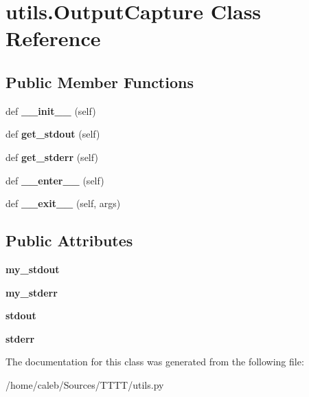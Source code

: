 \hypertarget{classutils_1_1OutputCapture}{}\section{utils.\+Output\+Capture Class Reference}
\label{classutils_1_1OutputCapture}
\subsection*{Public Member Functions}
\begin{DoxyCompactItemize}
\item 
\hypertarget{classutils_1_1OutputCapture_a12b47e1c17a8feb9449a99fcba7c73c0}{}\label{classutils_1_1OutputCapture_a12b47e1c17a8feb9449a99fcba7c73c0} 
def {\bfseries \+\_\+\+\_\+init\+\_\+\+\_\+} (self)
\item 
\hypertarget{classutils_1_1OutputCapture_a5920406b09c247bbcf35926684d5de7d}{}\label{classutils_1_1OutputCapture_a5920406b09c247bbcf35926684d5de7d} 
def {\bfseries get\+\_\+stdout} (self)
\item 
\hypertarget{classutils_1_1OutputCapture_a6f2f0f058167cdb4fb5a5e783ab9fe29}{}\label{classutils_1_1OutputCapture_a6f2f0f058167cdb4fb5a5e783ab9fe29} 
def {\bfseries get\+\_\+stderr} (self)
\item 
\hypertarget{classutils_1_1OutputCapture_a331101c4932b35b5b4d278d24d2b8bc4}{}\label{classutils_1_1OutputCapture_a331101c4932b35b5b4d278d24d2b8bc4} 
def {\bfseries \+\_\+\+\_\+enter\+\_\+\+\_\+} (self)
\item 
\hypertarget{classutils_1_1OutputCapture_ac8d3b8385124dce14a15cae263d1ef4c}{}\label{classutils_1_1OutputCapture_ac8d3b8385124dce14a15cae263d1ef4c} 
def {\bfseries \+\_\+\+\_\+exit\+\_\+\+\_\+} (self, args)
\end{DoxyCompactItemize}
\subsection*{Public Attributes}
\begin{DoxyCompactItemize}
\item 
\hypertarget{classutils_1_1OutputCapture_aea50ad5e82819a82336ebfbf059a5817}{}\label{classutils_1_1OutputCapture_aea50ad5e82819a82336ebfbf059a5817} 
{\bfseries my\+\_\+stdout}
\item 
\hypertarget{classutils_1_1OutputCapture_a37a95896d078d8272b8a6d3fe5d8c726}{}\label{classutils_1_1OutputCapture_a37a95896d078d8272b8a6d3fe5d8c726} 
{\bfseries my\+\_\+stderr}
\item 
\hypertarget{classutils_1_1OutputCapture_a2b7792a5d5ac2651714e08492f0f1953}{}\label{classutils_1_1OutputCapture_a2b7792a5d5ac2651714e08492f0f1953} 
{\bfseries stdout}
\item 
\hypertarget{classutils_1_1OutputCapture_a8ddd6827df4b531e7fbdcd43875de1fb}{}\label{classutils_1_1OutputCapture_a8ddd6827df4b531e7fbdcd43875de1fb} 
{\bfseries stderr}
\end{DoxyCompactItemize}


The documentation for this class was generated from the following file\+:\begin{DoxyCompactItemize}
\item 
/home/caleb/\+Sources/\+T\+T\+T\+T/utils.\+py\end{DoxyCompactItemize}
